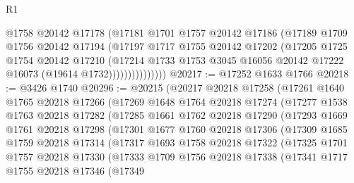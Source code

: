 \begin{lexlean}{R1}
\begin{coremodule}
                      @1758
                      @20142
                      @17178
                      (@17181
                        @1701
                        @1757
                        @20142
                        @17186
                        (@17189
                          @1709
                          @1756
                          @20142
                          @17194
                          (@17197
                            @1717
                            @1755
                            @20142
                            @17202
                            (@17205
                              @1725
                              @1754
                              @20142
                              @17210
                              (@17214
                                @1733
                                @1753
                                @3045
                                @16056
                                @20142
                                @17222
                                @16073
                                (@19614 @1732)))))))))))))))
@20217 := @17252 @1633 @1766
@20218 := @3426 @1740
@20296 := @20215
    (@20217
      @20218
      @17258
      (@17261
        @1640
        @1765
        @20218
        @17266
        (@17269
          @1648
          @1764
          @20218
          @17274
          (@17277
            @1538
            @1763
            @20218
            @17282
            (@17285
              @1661
              @1762
              @20218
              @17290
              (@17293
                @1669
                @1761
                @20218
                @17298
                (@17301
                  @1677
                  @1760
                  @20218
                  @17306
                  (@17309
                    @1685
                    @1759
                    @20218
                    @17314
                    (@17317
                      @1693
                      @1758
                      @20218
                      @17322
                      (@17325
                        @1701
                        @1757
                        @20218
                        @17330
                        (@17333
                          @1709
                          @1756
                          @20218
                          @17338
                          (@17341
                            @1717
                            @1755
                            @20218
                            @17346
                            (@17349

\end{coremodule}
\end{lexlean}
